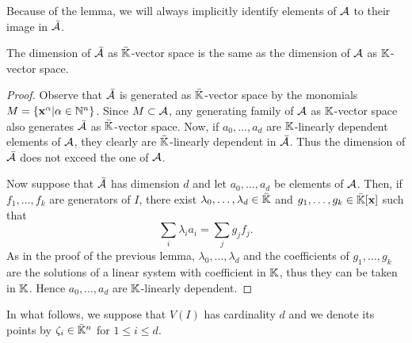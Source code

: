 Because of the lemma, we will always implicitly identify elements of
$\mathcal{A}$ to their image in $\bar{\mathcal{A}}$.

\begin{lemma}
  The dimension of $\bar{\mathcal{A}}$ as $\bar{\mathbb{K}}$-vector space is
  the same as the dimension of $\mathcal{A}$ as $\mathbb{K}$-vector space.
\end{lemma}
\begin{proof}
  Observe that $\bar{\mathcal{A}}$ is generated as $\bar{\mathbb{K}}$-vector
  space by the monomials $M=\{\mathbf{x}^\alpha|\alpha\in\mathbb{N}^n\}$. Since
  $M\subset\mathcal{A}$, any generating family of $\mathcal{A}$ as
  $\mathbb{K}$-vector space also generates $\bar{\mathcal{A}}$ as
  $\bar{\mathbb{K}}$-vector space.  Now, if $a_0,\ldots,a_d$ are
  $\mathbb{K}$-linearly dependent elements of $\mathcal{A}$, they clearly are
  $\bar{\mathbb{K}}$-linearly dependent in $\bar{\mathcal{A}}$. Thus the
  dimension of $\bar{\mathcal{A}}$ does not exceed the one of $\mathcal{A}$.

  Now suppose that $\bar{\mathcal{A}}$ has dimension $d$ and let
  $a_0,\ldots,a_d$ be elements of $\mathcal{A}$. Then, if
  $f_1,\ldots,f_k$ are generators of $I$, there exist
  $\lambda_0,\ldots,\lambda_d\in\bar{\mathbb{K}}$ and
  $g_1,\ldots,g_k\in\bar{\mathbb{K}}[\mathbf{x}]$ such that
  \begin{equation}
    \label{eq:115}
    \sum_i \lambda_ia_i = \sum_j g_jf_j
    \text{.}
  \end{equation}
  As in the proof of the previous lemma, $\lambda_0,\ldots,\lambda_d$
  and the coefficients of $g_1,\ldots,g_k$ are the solutions of a
  linear system with coefficient in $\mathbb{K}$, thus they can be taken in
  $\mathbb{K}$. Hence $a_0,\ldots,a_d$ are $\mathbb{K}$-linearly dependent.
\end{proof}


In what follows, we suppose that $V(I)$ has cardinality $d$ and we
denote its points by $\zeta_i\in\bar{\mathbb{K}}^n$ for $1\le i\le d$.

